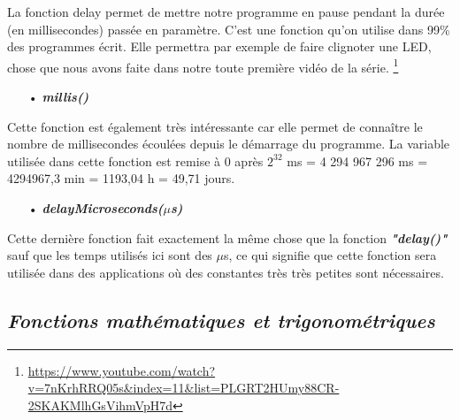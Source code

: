 \documentclass[12pt,a4paper]{article}
\begin{document}
La fonction delay permet de mettre notre programme en pause pendant la durée (en millisecondes) passée en paramètre. C’est une fonction qu’on utilise dans 99\% des programmes écrit. Elle permettra par exemple de faire clignoter une LED, chose que nous avons faite dans notre toute première vidéo de la série.
\footnote{\url{https://www.youtube.com/watch?v=7nKrhRRQ05s&index=11&list=PLGRT2HUmy88CR-2SKAKMlhGsVihmVpH7d}}

\bigskip
\begin{itemize}
    \item[•] \textit{\textbf{millis()}}
\end{itemize}

Cette fonction est également très intéressante car elle permet de connaître le nombre de millisecondes écoulées depuis le démarrage du programme. La variable utilisée dans cette fonction est remise à 0 après $2^{32}$ ms = 4 294 967 296 ms = 4294967,3 min = 1193,04 h = 49,71 jours.

\bigskip
\begin{itemize}
    \item[•] \textit{\textbf{delayMicroseconds($\mu$s)}}
\end{itemize}

Cette dernière fonction fait exactement la même chose que la fonction \textit{\textbf{"delay()"}}  sauf que les temps utilisés ici sont des $\mu$s, ce qui signifie que cette fonction sera utilisée dans des applications où des constantes très très petites sont nécessaires.

\bigskip

\subsection{\textit{\textbf{Fonctions mathématiques et trigonométriques}}}
\end{document}
